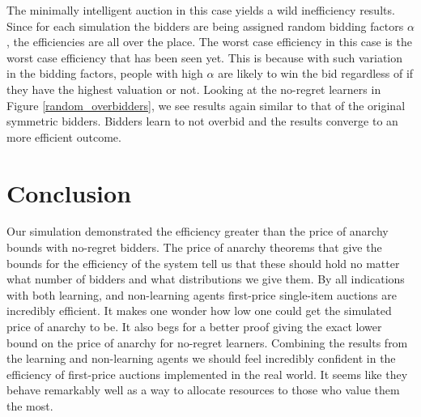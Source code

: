 \documentclass[12pt,twoside]{reedthesis}
\begin{document}
The minimally intelligent auction in this case yields a wild inefficiency results. Since for each simulation the bidders are being assigned random bidding factors $\alpha$, the efficiencies are all over the place. The worst case efficiency in this case is the worst case efficiency that has been seen yet. This is because with such variation in the bidding factors, people with high $\alpha$ are likely to win the bid regardless of if they have the highest valuation or not. Looking at the no-regret learners in Figure \ref{random_overbidders}, we see results again similar to that of the original symmetric bidders. Bidders learn to not overbid and the results converge to an more efficient outcome.



\chapter*{Conclusion}
	\setcounter{chapter}{4}
	\setcounter{section}{0}
	
Our simulation demonstrated the efficiency greater than the price of anarchy bounds with no-regret bidders. The price of anarchy theorems that give the bounds for the efficiency of the system tell us that these should hold no matter what number of bidders and what distributions we give them. By all indications with both learning, and non-learning agents first-price single-item auctions are incredibly efficient. It makes one wonder how low one could get the simulated price of anarchy to be. It also begs for a better proof giving the exact lower bound on the price of anarchy for no-regret learners. Combining the results from the learning and non-learning agents we should feel incredibly confident in the efficiency of first-price auctions implemented in the real world. It seems like they behave remarkably well as a way to allocate resources to those who value them the most. 
\end{document}
